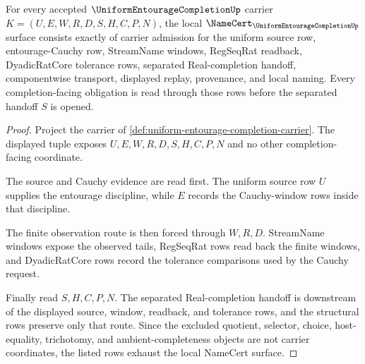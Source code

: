 \begin{theorem}
\label{thm:uniform-entourage-completion-namecert-obligations}
For every accepted $\UniformEntourageCompletionUp$ carrier $K=(U,E,W,R,D,S,H,C,P,N)$, the local $\NameCert_{\UniformEntourageCompletionUp}$ surface consists exactly of carrier admission for the uniform source row, entourage-Cauchy row, StreamName windows, RegSeqRat readback, DyadicRatCore tolerance rows, separated Real-completion handoff, componentwise transport, displayed replay, provenance, and local naming. Every completion-facing obligation is read through those rows before the separated handoff $S$ is opened.
\end{theorem}
\begin{proof}
Project the carrier of \autoref{def:uniform-entourage-completion-carrier}. The displayed tuple exposes $U,E,W,R,D,S,H,C,P,N$ and no other completion-facing coordinate.

The source and Cauchy evidence are read first. The uniform source row $U$ supplies the entourage discipline, while $E$ records the Cauchy-window rows inside that discipline.

The finite observation route is then forced through $W,R,D$. StreamName windows expose the observed tails, RegSeqRat rows read back the finite windows, and DyadicRatCore rows record the tolerance comparisons used by the Cauchy request.

Finally read $S,H,C,P,N$. The separated Real-completion handoff is downstream of the displayed source, window, readback, and tolerance rows, and the structural rows preserve only that route. Since the excluded quotient, selector, choice, host-equality, trichotomy, and ambient-completeness objects are not carrier coordinates, the listed rows exhaust the local NameCert surface.
\end{proof}


